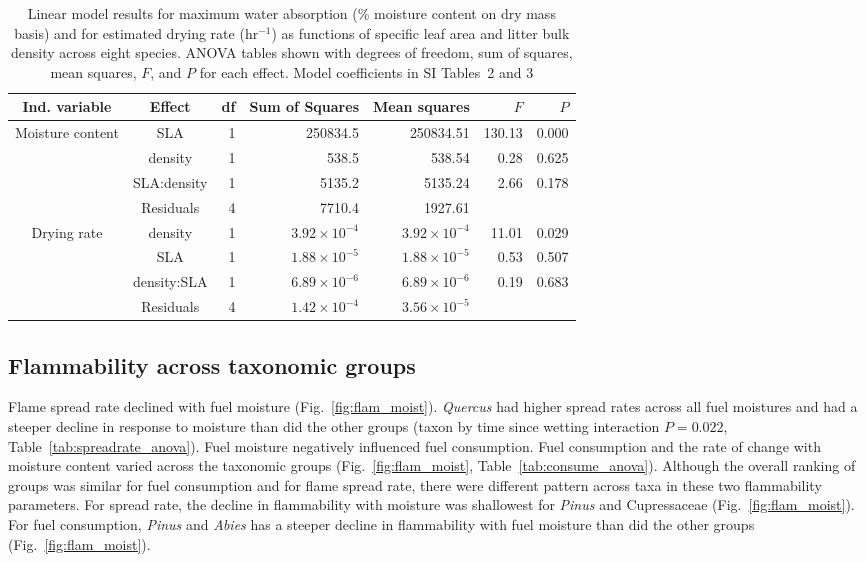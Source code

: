 \documentclass[letterpaper,12pt]{article}
\begin{document}
\begin{table}[h]
  \caption{Linear model results for maximum water absorption (\% moisture
    content on dry mass basis) and for estimated drying rate (hr$^{-1}$) as
    functions of specific leaf area and litter bulk density across eight
    species. ANOVA tables shown with degrees of freedom, sum of squares, mean
    squares, $F$, and $P$ for each effect. Model coefficients in SI Tables~2 and 3}
  \label{tab:mc_di_anova}
\centering

\begin{tabular}{ccrrrrr}
  \toprule
Ind. variable & Effect & df & Sum of Squares & Mean squares & $F$ & $P$ \\ 
  \midrule
Moisture content & SLA & 1 & 250834.5 & 250834.51 & 130.13 & 0.000 \\ 
  & density & 1 & 538.5 & 538.54 & 0.28 & 0.625 \\ 
  & SLA:density & 1 & 5135.2 & 5135.24 & 2.66 & 0.178 \\ 
  & Residuals & 4 & 7710.4 & 1927.61 &  &  \\ 
  \midrule
  
Drying rate & density & 1 & $3.92 \times 10^{-4}$ & $3.92 \times 10^{-4}$ & 11.01 & 0.029 \\ 
 &  SLA & 1 & $1.88 \times 10^{-5}$ & $1.88 \times 10^{-5}$ & 0.53 & 0.507 \\ 
 &  density:SLA & 1 & $6.89 \times 10^{-6}$ & $6.89 \times 10^{-6}$ & 0.19 & 0.683 \\ 
 &  Residuals & 4 & $1.42 \times 10^{-4}$ & $3.56 \times 10^{-5}$ &  &  \\ 
   \bottomrule

\end{tabular}
\end{table}

\subsection*{Flammability across taxonomic groups}

Flame spread rate declined with fuel moisture (Fig.~\ref{fig:flam_moist}).
\emph{Quercus} had higher spread rates across all fuel moistures and had a
steeper decline in response to moisture than did the other groups (taxon by
time since wetting interaction $P = 0.022$, Table~\ref{tab:spreadrate_anova}).
Fuel moisture negatively influenced fuel consumption. Fuel consumption and the
rate of change with moisture content varied across the taxonomic groups
(Fig.~\ref{fig:flam_moist}, Table~\ref{tab:consume_anova}). Although the
overall ranking of groups was similar for fuel consumption and for flame spread
rate, there were different pattern across taxa in these two flammability
parameters. For spread rate, the decline in flammability with moisture was
shallowest for \emph{Pinus} and Cupressaceae (Fig.~\ref{fig:flam_moist}). For
fuel consumption, \emph{Pinus} and \emph{Abies} has a steeper decline in
flammability with fuel moisture than did the other groups
(Fig.~\ref{fig:flam_moist}).
\end{document}
